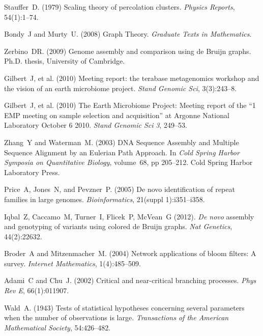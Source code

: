 \documentclass{pnastwo}
\begin{document}
\begin{article}
\begin{thebibliography}{10}
 Stauffer~D. (1979) Scaling theory of 
percolation clusters. {\it Physics Reports}, 54(1):1--74.

 Bondy~J and Murty~U. (2008) Graph Theory. {\it 
Graduate Texts in Mathematics}.

 Zerbino~DR. (2009) Genome assembly and comparison 
using de Bruijn graphs. Ph.D. thesis, University of Cambridge.

 Gilbert~J, et al. (2010) Meeting report: the terabase 
metagenomics workshop and the vision of an earth microbiome project. {\it 
Stand Genomic Sci}, 3(3):243--8.

 Gilbert~J, et al. (2010) The Earth Microbiome Project: 
Meeting report of the ``1 EMP meeting on sample selection and acquisition'' 
at Argonne National Laboratory October 6 2010. {\it Stand Genomic Sci} 
\emph{3}, 249--53.

 Zhang~Y and Waterman~M. (2003) DNA Sequence Assembly 
and Multiple Sequence Alignment by an Eulerian Path Approach. In {\it Cold 
Spring Harbor Symposia on Quantitative Biology}, volume~68, pp 205--212. 
Cold Spring Harbor Laboratory Press.

 Price~A, Jones~N, and Pevzner~P. (2005) De novo 
identification of repeat families in large genomes. {\it Bioinformatics}, 
21(suppl 1):i351--i358.

 Iqbal~Z, Caccamo~M, Turner~I, Flicek~P, McVean~G (2012).  {\it De novo} assembly and genotyping of variants using
colored de Bruijn graphs.  {\it Nat Genetics}, 44(2):22632.

Broder~A and Mitzenmacher~M. (2004) Network applications of bloom filters: 
A survey. {\it Internet Mathematics}, 1(4):485--509.

 Adami~C and Chu~J. (2002) Critical and 
near-critical branching processes. {\it Phys Rev E}, 66(1):011907.

 Wald~A. (1943) Tests of statistical hypotheses concerning 
several parameters when the number of observations is large. {\it Transactions 
of the American Mathematical Society}, 54:426--482.

\end{thebibliography}

\end{article}

\clearpage
\end{document}
